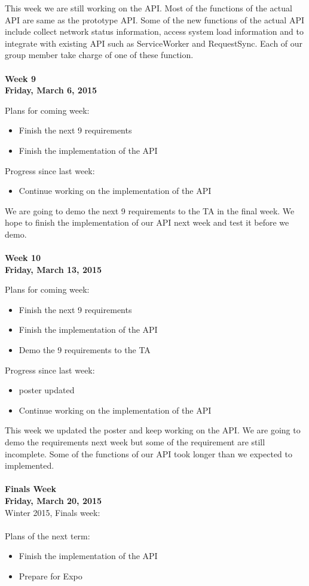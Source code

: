 \noindent This week we are still working on the API. Most of the functions of the actual API are same as the prototype API. Some of the new functions of the actual API include collect network status information, access system load information and to integrate with existing API such as ServiceWorker and RequestSync. Each of our group member take charge of one of these function. \\
\\
\textbf{Week 9\\Friday, March 6, 2015\\}

\noindent Plans for coming week:
\begin{itemize}
\item Finish the next 9 requirements
\item Finish the implementation of the API
\end{itemize}

\noindent Progress since last week:
\begin{itemize}
\item Continue working on the implementation of the API
\end{itemize}

\noindent We are going to demo the next 9 requirements to the TA in the final week. We hope to finish the implementation of our API next week and test it before we demo. \\
\\
\textbf{Week 10\\Friday, March 13, 2015\\}

\noindent Plans for coming week:
\begin{itemize}
\item Finish the next 9 requirements
\item Finish the implementation of the API
\item Demo the 9 requirements to the TA
\end{itemize}

\noindent Progress since last week:
\begin{itemize}
\item poster updated
\item Continue working on the implementation of the API
\end{itemize}

\noindent This week we updated the poster and keep working on the API. We are going to demo the requirements next week but some of the requirement are still incomplete. Some of the functions of our API took longer than we expected to implemented. \\
\\
\textbf{Finals Week\\Friday, March 20, 2015\\}
Winter 2015, Finals week: \\
\\
\noindent Plans of the next term:
\begin{itemize}
\item Finish the implementation of the API
\item Prepare for Expo
\end{itemize}

